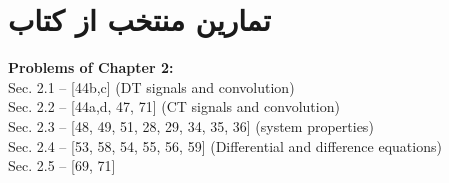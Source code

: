 \documentclass[a4paper]{article}
\begin{document}
	\section{تمارین منتخب از کتاب}
	\begin{latin}
		\textbf{Problems of Chapter 2:}\\
		Sec. 2.1 – [44b,c] (DT signals and convolution) \\
		Sec. 2.2 – [44a,d, 47, 71] (CT signals and convolution) \\
		Sec. 2.3 – [48, 49, 51, 28, 29, 34, 35, 36] (system properties)\\
		Sec. 2.4 – [53, 58, 54, 55, 56, 59] (Differential and difference equations) \\
		Sec. 2.5 – [69, 71]
	\end{latin}
\end{document}
